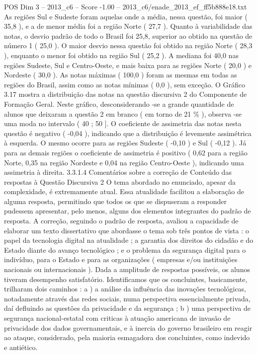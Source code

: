 \begin{textsample}{POS Dim 3 – 2013\_c6 – Score -1.00 – 2013\_c6/enade\_2013\_ef\_ff5b888e18.txt}
As regiões Sul e Sudeste foram aquelas onde a média, nessa questão, foi maior ( 35,8 ), e a de menor média foi a região Norte ( 27,7 ).
Quanto à variabilidade das notas, o desvio padrão de todo o Brasil foi 25,8, superior ao obtido na questão de número 1 ( 25,0 ).
O maior desvio nessa questão foi obtido na região Norte ( 28,3 ), enquanto o menor foi obtido na região Sul ( 25,2 ).
A mediana foi 40,0 nas regiões Sudeste, Sul e Centro-Oeste, e mais baixa para as regiões Norte ( 20,0 ) e Nordeste ( 30,0 ).
As notas máximas ( 100,0 ) foram as mesmas em todas as regiões do Brasil, assim como as notas mínimas ( 0,0 ), sem exceção.
O Gráfico 3.17 mostra a distribuição das notas na questão discursiva 2 do Componente de Formação Geral.
Neste gráfico, desconsiderando -se a grande quantidade de alunos que deixaram a questão 2 em branco ( em torno de 21 \% ), observa -se uma moda no intervalo ( 40 ; 50 ].
O coeficiente de assimetria das notas nesta questão é negativo ( -0,04 ), indicando que a distribuição é levemente assimétrica à esquerda.
O mesmo ocorre para as regiões Sudeste ( -0,10 ) e Sul ( -0,12 ).
Já para as demais regiões o coeficiente de assimetria é positivo ( 0,62 para a região Norte, 0,35 na região Nordeste e 0,04 na região Centro-Oeste ), indicando uma assimetria à direita. 3.3.1.4 Comentários sobre a correção de Conteúdo das respostas à Questão Discursiva 2 O tema abordado no enunciado, apesar da complexidade, é extremamente atual.
Essa atualidade facilitou a elaboração de alguma resposta, permitindo que todos os que se dispuseram a responder pudessem apresentar, pelo menos, alguns dos elementos integrantes do padrão de resposta.
A correção, seguindo o padrão de resposta, avaliou a capacidade de elaborar um texto dissertativo que abordasse o tema sob três pontos de vista : o papel da tecnologia digital na atualidade ; a garantia dos direitos do cidadão e do Estado diante do avanço tecnológico ; e o problema da segurança digital para o indivíduo, para o Estado e para as organizações ( empresas e/ou instituições nacionais ou internacionais ).
Dada a amplitude de respostas possíveis, os alunos tiveram desempenho satisfatório.
Identificamos que os concluintes, basicamente, trilharam dois caminhos : a ) a análise da influência das inovações tecnológicas, notadamente através das redes sociais, numa perspectiva essencialmente privada, daí defluindo as questões da privacidade e da segurança ; b ) uma perspectiva de segurança nacional-estatal com criticas à atuação americana de invasão de privacidade dos dados governamentais, e à inercia do governo brasileiro em reagir ao ataque, considerado, pela maioria esmagadora dos concluintes, como indevido e antiético.

\end{textsample}

